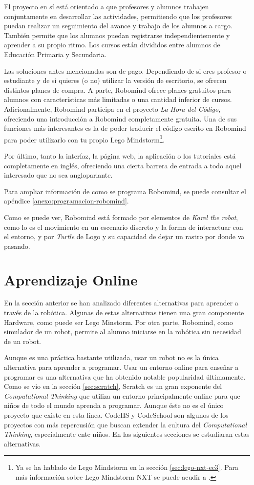 El proyecto en sí está orientado a que profesores y alumnos trabajen conjuntamente en desarrollar las actividades, permitiendo que los profesores puedan realizar un seguimiento del avance y trabajo de los alumnos a cargo. También permite que los alumnos puedan registrarse independientemente y aprender a su propio ritmo. Los cursos están divididos entre alumnos de Educación Primaria y Secundaria. 

Las soluciones antes mencionadas son de pago. Dependiendo de si eres profesor o estudiante y de si quieres (o no) utilizar la versión de escritorio, se ofrecen distintos planes de compra. 
A parte, Robomind ofrece planes gratuitos para alumnos con características más limitadas o una cantidad inferior de cursos. Adicionalmente, Robomind participa en el proyecto \emph{La Hora del Código}\cite{hour-of-code}, ofreciendo una introducción a Robomind completamente gratuita. Una de sus funciones más interesantes es la de poder traducir el código escrito en Robomind para poder utilizarlo con tu propio Lego Mindstorm\footnote{Ya se ha hablado de Lego Mindstorm en la sección \ref{sec:lego-nxt-ec3}. Para más información sobre Lego Mindstorm NXT se puede acudir a \cite{lego-mindstorm}.}.

Por último, tanto la interfaz, la página web, la aplicación o los tutoriales está completamente en inglés, ofreciendo una cierta barrera de entrada a todo aquel interesado que no sea angloparlante. 

Para ampliar información de como se programa Robomind, se puede consultar el apéndice \ref{anexo:programacion-robomind}.

Como se puede ver, Robomind está formado por elementos de \emph{Karel the robot}, como lo es el movimiento en un escenario discreto y la forma de interactuar con el entorno, y por \emph{Turtle} de Logo y su capacidad de dejar un rastro por donde va pasando.


\section{Aprendizaje Online}
\label{sec:aprendiendo-online}

En la sección anterior se han analizado diferentes alternativas para aprender a través de la robótica. Algunas de estas alternativas tienen una gran componente Hardware, como puede ser Lego Minstorm. Por otra parte, Robomind, como simulador de un robot, permite al alumno iniciarse en la robótica sin necesidad  de un robot. 

Aunque es una práctica bastante utilizada, usar un robot no es la única alternativa para aprender a programar. Usar un entorno online para enseñar a programar es una alternativa que ha obtenido notable popularidad últimamente. Como se vio en la sección \ref{sec:scratch}, Scratch es un gran exponente del \emph{Computational Thinking} que utiliza un entorno principalmente online para que niños de todo el mundo aprenda a programar. Aunque éste no es el único proyecto que existe en esta línea. CodeHS y CodeSchool son algunos de los proyectos con más repercusión que buscan extender la cultura del \emph{Computational Thinking}, especialmente ente niños. En las siguientes secciones se estudiaran estas alternativas.

